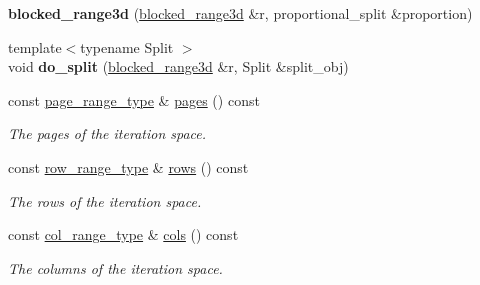 \begin{DoxyCompactItemize}
\item 
\hypertarget{classtbb_1_1blocked__range3d_a0e5fdb794ec7bfc5f21a59ddd466d8e0}{}{\bfseries blocked\+\_\+range3d} (\hyperlink{classtbb_1_1blocked__range3d}{blocked\+\_\+range3d} \&r, proportional\+\_\+split \&proportion)\label{classtbb_1_1blocked__range3d_a0e5fdb794ec7bfc5f21a59ddd466d8e0}

\item 
\hypertarget{classtbb_1_1blocked__range3d_ac83b305fb6dc5da50a4f6c4fdb551654}{}{\footnotesize template$<$typename Split $>$ }\\void {\bfseries do\+\_\+split} (\hyperlink{classtbb_1_1blocked__range3d}{blocked\+\_\+range3d} \&r, Split \&split\+\_\+obj)\label{classtbb_1_1blocked__range3d_ac83b305fb6dc5da50a4f6c4fdb551654}

\item 
\hypertarget{classtbb_1_1blocked__range3d_a5b794fd53ba92106aeafa4eed85731d4}{}const \hyperlink{classtbb_1_1blocked__range3d_a8cdc866378a12ce198da870d0439676f}{page\+\_\+range\+\_\+type} \& \hyperlink{classtbb_1_1blocked__range3d_a5b794fd53ba92106aeafa4eed85731d4}{pages} () const \label{classtbb_1_1blocked__range3d_a5b794fd53ba92106aeafa4eed85731d4}

\begin{DoxyCompactList}\small\item\em The pages of the iteration space. \end{DoxyCompactList}\item 
\hypertarget{classtbb_1_1blocked__range3d_aeac1def585af81467573f30ebb42cb4f}{}const \hyperlink{classtbb_1_1blocked__range}{row\+\_\+range\+\_\+type} \& \hyperlink{classtbb_1_1blocked__range3d_aeac1def585af81467573f30ebb42cb4f}{rows} () const \label{classtbb_1_1blocked__range3d_aeac1def585af81467573f30ebb42cb4f}

\begin{DoxyCompactList}\small\item\em The rows of the iteration space. \end{DoxyCompactList}\item 
\hypertarget{classtbb_1_1blocked__range3d_a308d7089a1d53ff26770a7040ed817cd}{}const \hyperlink{classtbb_1_1blocked__range}{col\+\_\+range\+\_\+type} \& \hyperlink{classtbb_1_1blocked__range3d_a308d7089a1d53ff26770a7040ed817cd}{cols} () const \label{classtbb_1_1blocked__range3d_a308d7089a1d53ff26770a7040ed817cd}

\begin{DoxyCompactList}\small\item\em The columns of the iteration space. \end{DoxyCompactList}\end{DoxyCompactItemize}
